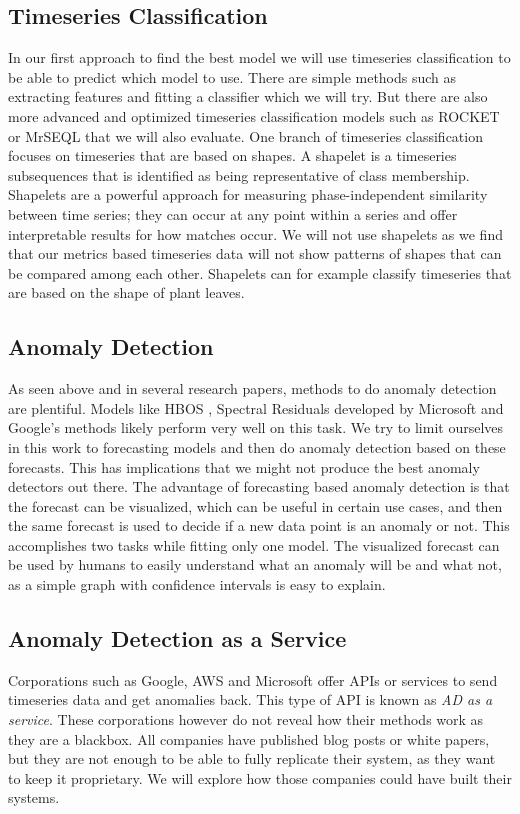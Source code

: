 \subsection{Timeseries Classification}

In our first approach to find the best model we will use timeseries classification to be able to predict which model to use. There are simple methods such as extracting features and fitting a classifier \cite{tsfresh} which we will try. But there are also more advanced and optimized timeseries classification models such as ROCKET \cite{ROCKET} or MrSEQL \cite{MRSEQL} that we will also evaluate. 
One branch of timeseries classification focuses on timeseries that are based on shapes. A shapelet \cite{SHAPELET} is a timeseries subsequences that is identified as being representative of class membership. Shapelets are a powerful approach for measuring phase-independent similarity between time series; they can occur at any point within a series and offer interpretable results for how matches occur. We will not use shapelets as we find that our metrics based timeseries data will not show patterns of shapes that can be compared among each other. Shapelets can for example classify timeseries that are based on the shape of plant leaves.


\subsection{Anomaly Detection}

As seen above and in several research papers, methods to do anomaly detection are plentiful. Models like HBOS \cite{HBOS}, Spectral Residuals \cite{AD-SR} developed by Microsoft and Google's methods \cite{AD-GOOGLE} likely perform very well on this task. We try to limit ourselves in this work to forecasting models and then do anomaly detection based on these forecasts. This has implications that we might not produce the best anomaly detectors out there. The advantage of forecasting based anomaly detection is that the forecast can be visualized, which can be useful in certain use cases, and then the same forecast is used to decide if a new data point is an anomaly or not. This accomplishes two tasks while fitting only one model. The visualized forecast can be used by humans to easily understand what an anomaly will be and what not, as a simple graph with confidence intervals is easy to explain.

\subsection{Anomaly Detection as a Service}

Corporations such as Google, AWS and Microsoft offer APIs or services to send timeseries data and get anomalies back. This type of API is known as \emph{AD as a service}. These corporations however do not reveal how their methods work as they are a blackbox. All companies have published blog posts or white papers, but they are not enough to be able to fully replicate their system, as they want to keep it proprietary. We will explore how those companies could have built their systems.
